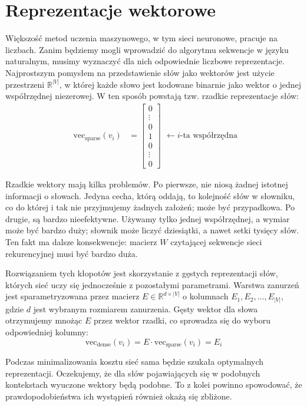 \section{Reprezentacje wektorowe} \label{wektory}
Większość metod uczenia maszynowego, w tym sieci neuronowe, pracuje na liczbach. Zanim będziemy mogli wprowadzić do algorytmu sekwencje w języku naturalnym, musimy wyznaczyć dla nich odpowiednie liczbowe reprezentacje. Najprostszym pomysłem na przedstawienie słów jako wektorów jest użycie przestrzeni $\mathbb{R}^{|V|}$, w której każde słowo jest kodowane binarnie jako wektor o jednej współrzędnej niezerowej. W ten sposób powstają tzw. rzadkie reprezentacje słów:
\[
\begin{aligned}
    \mathrm{vec_{sparse}}(v_i) &=
    \begin{bmatrix}
        0 \\
        \vdots \\
        0 \\
        1 \\
        0 \\
        \vdots \\
        0
    \end{bmatrix}
\end{aligned} \leftarrow i\text{-ta współrzędna}
\]

Rzadkie wektory mają kilka problemów. Po pierwsze, nie niosą żadnej istotnej informacji o słowach. Jedyna cecha, którą oddają, to kolejność słów w słowniku, co do której i tak nie przyjmujemy żadnych założeń; może być przypadkowa. Po drugie, są bardzo nieefektywne. Używamy tylko jednej współrzędnej, a wymiar może być bardzo duży; słownik może liczyć dziesiątki, a nawet setki tysięcy słów. Ten fakt ma dalsze konsekwencje: macierz $W$ czytającej sekwencje sieci rekurencyjnej musi być bardzo duża.

Rozwiązaniem tych kłopotów jest skorzystanie z gęstych reprezentacji słów, których sieć uczy się jednocześnie z pozostałymi parametrami. Warstwa zanurzeń jest sparametryzowana przez macierz $E \in \mathbb{R}^{d \times |V|}$ o kolumnach $E_1, E_2, \dots, E_{|V|}$, gdzie $d$ jest wybranym rozmiarem zanurzenia. Gęsty wektor dla słowa otrzymujemy mnożąc $E$ przez wektor rzadki, co sprowadza się do wyboru odpowiedniej kolumny:
\[\mathrm{vec_{dense}}(v_i) = E \cdot \mathrm{vec_{sparse}}(v_i) = E_i\]

Podczas minimalizowania kosztu sieć sama będzie szukała optymalnych reprezentacji. Oczekujemy, że dla słów pojawiających się w podobnych kontekstach wyuczone wektory będą podobne. To z kolei powinno spowodować, że prawdopodobieństwa ich wystąpień również okażą się zbliżone.

